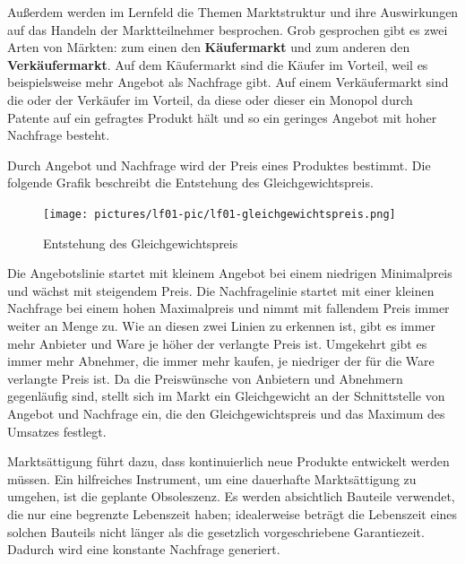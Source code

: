 Außerdem werden im Lernfeld die Themen Marktstruktur und ihre Auswirkungen auf das Handeln der Marktteilnehmer besprochen. Grob gesprochen gibt es zwei Arten von Märkten: zum einen den {\bf Käufermarkt} und zum anderen den {\bf Verkäufermarkt}. Auf dem Käufermarkt sind die Käufer im Vorteil, weil es beispielsweise mehr Angebot als Nachfrage gibt. Auf einem Verkäufermarkt sind die oder der Verkäufer im Vorteil, da diese oder dieser ein Monopol durch Patente auf ein gefragtes Produkt hält und so ein geringes Angebot mit hoher Nachfrage besteht.

Durch Angebot und Nachfrage wird der Preis eines Produktes bestimmt. Die folgende Grafik beschreibt die Entstehung des Gleichgewichtspreis.

\begin{figure}
	\begin{center}
		\texttt{[image: pictures/lf01-pic/lf01-gleichgewichtspreis.png]}
	\end{center}
	\caption{Entstehung des Gleichgewichtspreis}
\end{figure}

Die Angebotslinie startet mit kleinem Angebot bei einem niedrigen Minimalpreis und wächst mit steigendem Preis. Die Nachfragelinie startet mit einer kleinen Nachfrage bei einem hohen Maximalpreis und nimmt mit fallendem Preis immer weiter an Menge zu. Wie an diesen zwei Linien zu erkennen ist, gibt es immer mehr Anbieter und Ware je höher der verlangte Preis ist. Umgekehrt gibt es immer mehr Abnehmer, die immer mehr kaufen, je niedriger der für die Ware verlangte Preis ist. Da die Preiswünsche von Anbietern und Abnehmern gegenläufig sind, stellt sich im Markt ein Gleichgewicht an der Schnittstelle von Angebot und Nachfrage ein, die den Gleichgewichtspreis und das Maximum des Umsatzes festlegt.

Marktsättigung führt dazu, dass kontinuierlich neue Produkte entwickelt werden müssen. Ein hilfreiches Instrument, um eine dauerhafte Marktsättigung zu umgehen, ist die geplante Obsoleszenz. Es werden absichtlich Bauteile verwendet, die nur eine begrenzte Lebenszeit haben; idealerweise beträgt die Lebenszeit eines solchen Bauteils nicht länger als die gesetzlich vorgeschriebene Garantiezeit. Dadurch wird eine konstante Nachfrage generiert.


